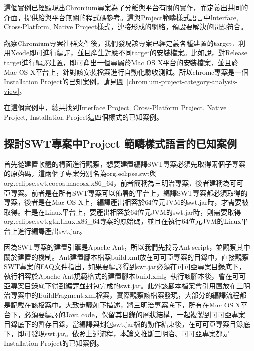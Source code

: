 這個實例已經顯現出Chromium專案為了分離與平台有關的實作，而定義出共同的介面，提供給與平台無關的程式碼參考。這與Project範疇樣式語言中Interface, Cross-Platform, Native Project樣式，連接形成的網絡，預設要解決的問題符合。

觀察Chromium專案社群文件後，我們發現該專案已經定義各種建置的target，利用Xcode即可進行編譯，並且產生對應不同target的安裝檔案。比如說，對Release target進行編譯建置，即可產出一個專屬於Mac OS X平台的安裝檔案，並且於Mac OS X平台上，針對該安裝檔案進行自動化驗收測試。所以chrome專案是一個Installation Project的已知案例，請見圖~\ref{chromium-project-category-analysis-view}。

在這個實例中，總共找到Interface Project, Cross-Platform Project, Native Project, Installation Project這四個樣式的已知案例。

\subsection{探討SWT專案中Project 範疇樣式語言的已知案例}
首先從建置軟體的構面進行觀察，想要建置編譯SWT專案必須先取得兩個子專案的原始碼，這兩個子專案分別名為org.eclipse.swt與org\-.eclipse\-.swt\-.cocoa\-.macosx\-.x86\_64，前者簡稱為三明治專案，後者建稱為可可亞專案。前者是在所有SWT專案可以佈署的平台上，編譯SWT專案都必須取得的專案，後者是在Mac OS X上，編譯產出相容於64位元JVM的swt.jar時，才需要被取得。若是在Linux平台上，要產出相容於64位元JVM的swt.jar時，則需要取得org.eclipse.swt.gtk.linux.x86\_64專案的原始碼，並且在執行64位元JVM的Linux平台上進行編譯產出swt.jar。

因為SWT專案的建置引擎是Apache Ant\cite{ant}，所以我們先找尋Ant script，並觀察其中關於建置的機制。Ant建置腳本檔案build.xml放在可可亞專案的目錄中，直接觀察SWT專案的FAQ文件指出，如果要編譯得到swt.jar必須在可可亞專案目錄底下，執行相容於Apache Ant規範格式的建置腳本build.xml。執行該腳本後，會在可可亞專案目錄底下得到編譯並封包完成的swt.jar。此外該腳本檔案會引用置放在三明治專案中的BuildFragment.xml檔案，實際觀察該檔案發現，大部分的編譯流程都是記載在該檔案中。大致步驟如下描述，將三明治專案底下，所有在Mac OS X平台下，必須要編譯的Java code，保留其目錄的層狀結構，一起複製到可可亞專案目錄底下的暫存目錄，當編譯與封包swt.jar檔的動作結束後，在可可亞專案目錄底下，即可發現swt.jar。依照上述流程，本論文推斷三明治、可可亞專案都是Installation Project的已知案例。

